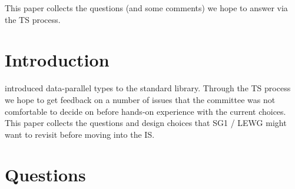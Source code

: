\newcommand\wgTitle{Expected Feedback from \code{simd} in the Parallelism TS 2}
\newcommand\wgName{Matthias Kretz <m.kretz@gsi.de>}
\newcommand\wgDocumentNumber{P1915R0}
\newcommand\wgGroup{SG1 / LEWG}

\usepackage{mymacros}
\usepackage{wg21}
\usepackage{underscore}



\newcommand\simd[1][]{\type{simd#1}\xspace}
\newcommand\simdT{\type{simd<T>}\xspace}
\newcommand\valuetype{\type{value\_type}\xspace}
\newcommand\referencetype{\type{reference}\xspace}
\newcommand\whereexpression{\type{where\_expression}\xspace}
\newcommand\simdcast{\code{simd\_cast}\xspace}
\newcommand\mask[1][]{\type{simd\_mask#1}\xspace}
\newcommand\maskT{\type{simd\_mask<T>}\xspace}
\newcommand\fixedsizeN{\type{simd\_abi::fixed\_size<N>}\xspace}
\newcommand\fixedsizescoped{\type{simd\_abi::fixed\_size}\xspace}
\newcommand\fixedsize{\type{fixed\_size}\xspace}
\newcommand\simdEP{\code{execution::}\type{simd}\xspace}
\newcommand\seqEP{\code{execution::}\type{seq}\xspace}

\usepackage{pifont}

\newcommand\chck{\item[\color{black}\ensuremath{\checkmark}]}
\newcommand\todo{\item[\color{black}\ding{46}] \color{gray}}
\newcommand\itemheader[1]{\item[] \hfill \textcolor{gray}{\textsc{#1}}}


\begin{wgTitlepage}
  This paper collects the questions (and some comments) we hope to answer via the TS process.
\end{wgTitlepage}

\pagestyle{scrheadings}
\section{Introduction}
\textcite{pts2} introduced data-parallel types to the standard library.
Through the TS process we hope to get feedback on a number of issues that the committee was not comfortable to decide on before hands-on experience with the current choices.
This paper collects the questions and design choices that SG1 / LEWG might want to revisit before moving \simdT into the IS.

\section{Questions}

